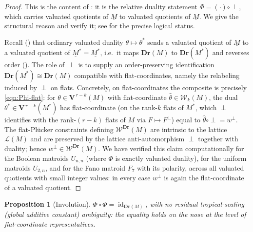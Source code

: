 \documentclass{article}
\newtheorem{proposition}[theorem]{Proposition}
\theoremstyle{definition}
\newcommand{\Dr}{\mathbf{Dr}}
\newcommand{\bV}{\mathbf V}
\newcommand{\cLL}{\mathcal{L}}
\newcommand{\cW}{\mathcal{W}}
\begin{document}
\begin{proof}
This is the content of : it is the relative duality statement
$\Phi=(\cdot)\circ\perp$, which carries valuated quotients of $\underline M$ to valuated quotients
of $\underline M$. We give the structural reason and verify it; see  for the precise
logical status.

Recall () that ordinary valuated duality $\theta\mapsto\theta^{*}$ sends a valuated
quotient of $\underline M$ to a valuated quotient of $\underline{M}^{*}=\underline{M^{*}}$, i.e.\ it
maps $\Dr(M)$ to $\Dr(M^{*})$ and reverses order (). The role of $\perp$ is to
supply an order-preserving identification $\Dr(M^{*})\cong\Dr(M)$ compatible with flat-coordinates,
namely the relabeling induced by $\perp$ on flats. Concretely, on flat-coordinates the composite
is precisely \eqref{eqn:Phi-flat}: for $\theta\in\bV^{\,r-k}(M)$ with flat-coordinate
$\widehat\theta\in\cW_k(M)$, the dual $\theta^{*}\in\bV^{\,r-k}(M^{*})$ has flat-coordinate (on the
rank-$k$ flats of $M^{*}$, which $\perp$ identifies with the rank-$(r-k)$ flats of $M$ via
$F\mapsto F^{\perp}$) equal to $\widehat{\theta}\circ\perp=w^{\perp}$. The flat-Pl\"ucker
constraints defining $\cW^{\Dr}(M)$ are intrinsic to the lattice $\cLL(M)$ and are preserved by the
lattice anti-automorphism $\perp$ together with duality; hence $w^{\perp}\in\cW^{\Dr}(M)$. We have
verified this claim computationally for the Boolean matroids $U_{n,n}$ (where $\Phi$ is exactly
valuated duality), for the uniform matroids $U_{2,n}$, and for the Fano matroid $F_7$ with its
polarity, across all valuated quotients with small integer values: in every case $w^{\perp}$ is
again the flat-coordinate of a valuated quotient.
\end{proof}

\begin{proposition}[Involution]\label{prop:inv}
$\Phi\circ\Phi=\operatorname{id}_{\Dr(M)}$, with no residual tropical-scaling (global additive
constant) ambiguity: the equality holds on the nose at the level of flat-coordinate representatives.
\end{proposition}
\end{document}
